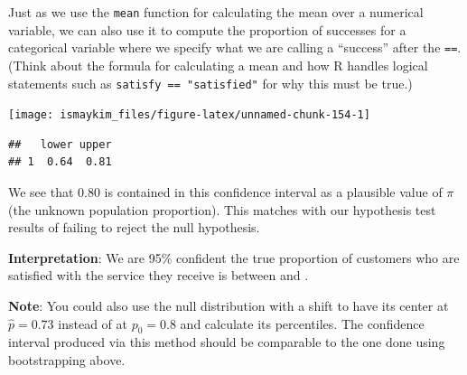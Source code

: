 \documentclass[]{tufte-book}
\newenvironment{Shaded}{\begin{snugshade}}{\end{snugshade}}
\newcommand{\KeywordTok}[1]{\textcolor[rgb]{0.13,0.29,0.53}{\textbf{{#1}}}}
\newcommand{\DataTypeTok}[1]{\textcolor[rgb]{0.13,0.29,0.53}{{#1}}}
\newcommand{\DecValTok}[1]{\textcolor[rgb]{0.00,0.00,0.81}{{#1}}}
\newcommand{\FloatTok}[1]{\textcolor[rgb]{0.00,0.00,0.81}{{#1}}}
\newcommand{\StringTok}[1]{\textcolor[rgb]{0.31,0.60,0.02}{{#1}}}
\newcommand{\NormalTok}[1]{{#1}}
\begin{document}
Just as we use the \texttt{mean} function for calculating the mean over
a numerical variable, we can also use it to compute the proportion of
successes for a categorical variable where we specify what we are
calling a ``success'' after the \texttt{==}. (Think about the formula
for calculating a mean and how R handles logical statements such as
\texttt{satisfy\ ==\ "satisfied"} for why this must be true.)

\begin{Shaded}
\end{Shaded}

\begin{center}\texttt{[image: ismaykim\_files/figure-latex/unnamed-chunk-154-1]} \end{center}

\begin{Shaded}
\end{Shaded}

\begin{verbatim}
##   lower upper
## 1  0.64  0.81
\end{verbatim}

We see that 0.80 is contained in this confidence interval as a plausible
value of \(\pi\) (the unknown population proportion). This matches with
our hypothesis test results of failing to reject the null hypothesis.

\textbf{Interpretation}: We are 95\% confident the true proportion of
customers who are satisfied with the service they receive is between and
.

\textbf{Note}: You could also use the null distribution with a shift to
have its center at \(\hat{p} = 0.73\) instead of at \(p_0 = 0.8\) and
calculate its percentiles. The confidence interval produced via this
method should be comparable to the one done using bootstrapping above.
\end{document}
